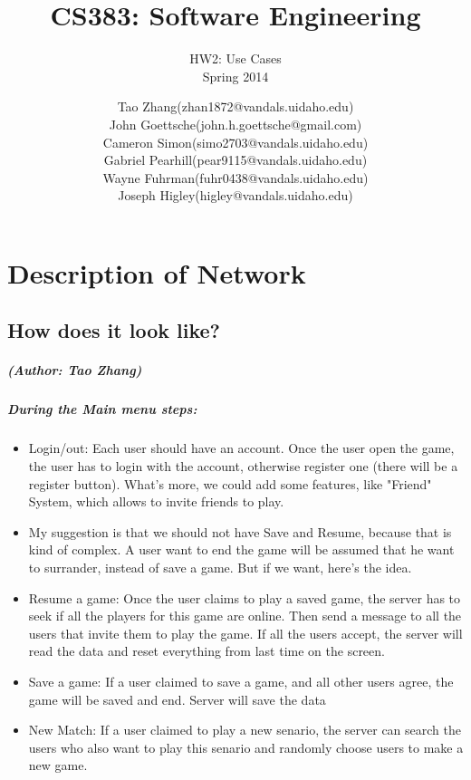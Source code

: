 \documentclass[12pt,letterpaper]{scrreprt}
\title{CS383: Software Engineering}
\subtitle{HW2: Use Cases\\Spring 2014}
\author{Tao Zhang(zhan1872@vandals.uidaho.edu)\\
		John Goettsche(john.h.goettsche@gmail.com)\\
		Cameron Simon(simo2703@vandals.uidaho.edu)\\
		Gabriel Pearhill(pear9115@vandals.uidaho.edu)\\ 
		Wayne Fuhrman(fuhr0438@vandals.uidaho.edu)\\
		Joseph Higley(higley@vandals.uidaho.edu)}
\date{}
\begin{document}
\maketitle
\tableofcontents %

\chapter{Description of Network}
\section{How does it look like?}
\paragraph{(Author: Tao Zhang)}
\paragraph{During the Main menu steps: }
\begin{itemize}
	\item Login/out: Each user should have an account. Once the user open the game, the user has to login with the account, otherwise register one (there will be a register button). What's more, we could add some features, like "Friend" System, which allows to invite friends to play.
	\item My suggestion is that we should not have Save and Resume, because that is kind of complex. A user want to end the game will be assumed that he want to surrander, instead of save a game. But if we want, here's the idea.
	\item Resume a game: Once the user claims to play a saved game, the server has to seek if all the players for this game are online. Then send a message to all the users that invite them to play the game. If all the users accept, the server will read the data and reset everything from last time on the screen.
	\item Save a game: If a user claimed to save a game, and all other users agree, the game will be saved and end. Server will save the data
	\item New Match: If a user claimed to play a new senario, the server can search the users who also want to play this senario and randomly choose users to make a new game.
\end{itemize}
\end{document}
